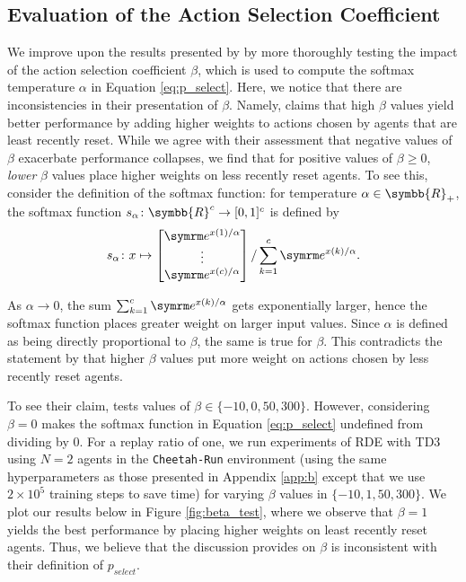 \documentclass[base]{subfiles}
\begin{document}
\subsection{Evaluation of the Action Selection Coefficient}
\label{ssec:errors}

We improve upon the results presented by \cite{kim2023} by more thoroughly testing the impact of the action selection coefficient $\beta$, which is used to compute the softmax temperature $\alpha$ in Equation \ref{eq:p_select}.
Here, we notice that there are inconsistencies in their presentation of $\beta$.
Namely, \cite{kim2023} claims that high $\beta$ values yield better performance by adding higher weights to actions chosen by agents that are least recently reset.
While we agree with their assessment that negative values of $\beta$ exacerbate performance collapses, we find that for positive values of $\beta \ge 0$, \textit{lower} $\beta$ values place higher weights on less recently reset agents.
To see this, consider the definition of the softmax function:
for temperature \(\alpha \in \symbb{R}_+\), the softmax function \(s_{\alpha} \colon \symbb{R}^c \to [0,1]^c\) is defined by
\begin{equation*}
	s_{\alpha} \colon x \mapsto \begin{bmatrix}
		\e^{x(1) / \alpha} \\
		\vdots             \\
		\e^{x(c) / \alpha}
	\end{bmatrix} / \sum_{k=1}^c \e^{x(k) / \alpha}.
\end{equation*}

As $\alpha \rightarrow 0$, the sum $\sum_{k=1}^c \e^{x(k) / \alpha}$ gets exponentially larger, hence the softmax function places greater weight on larger input values.
Since $\alpha$ is defined as being directly proportional to $\beta$, the same is true for $\beta$.
This contradicts the statement by \cite{kim2023} that higher $\beta$ values put more weight on actions chosen by less recently reset agents.

To see their claim, \cite{kim2023} tests values of $\beta \in \{-10, 0, 50, 300 \}$.
However, considering $\beta=0$ makes the softmax function in Equation \ref{eq:p_select} undefined from dividing by $0$.
For a replay ratio of one, we run experiments of RDE with TD3 using $N=2$ agents in the \texttt{Cheetah-Run} environment (using the same hyperparameters as those presented in Appendix \ref{app:b} except that we use $2 \times 10^5$ training steps to save time) for varying $\beta$ values in $\{-10, 1, 50, 300\}$.
We plot our results below in Figure \ref{fig:beta_test}, where we observe that $\beta=1$ yields the best performance by placing higher weights on least recently reset agents.
Thus, we believe that the discussion \cite{kim2023} provides on $\beta$ is inconsistent with their definition of $p_{select}$.
\end{document}
